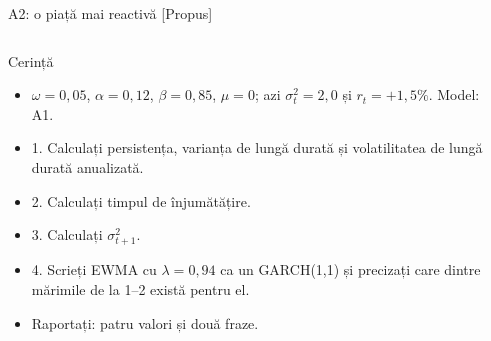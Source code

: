 \begin{frame}{A2: o piață mai reactivă [Propus]}
\propsub
\itemsize{\scriptsize}
\begin{columns}[T]
\begin{column}{\taskw}
\begin{block}{Cerință}
\begin{itemize}
    \item $\omega = 0{,}05$, $\alpha = 0{,}12$, $\beta = 0{,}85$, $\mu = 0$; azi $\sigma_t^2 = 2{,}0$ și $r_t = +1{,}5\%$. Model: A1.
    \item 1. Calculați persistența, varianța de lungă durată și volatilitatea de lungă durată anualizată.
    \item 2. Calculați timpul de înjumătățire.
    \item 3. Calculați $\sigma_{t+1}^2$.
    \item 4. Scrieți EWMA cu $\lambda = 0{,}94$ ca un GARCH(1,1) și precizați care dintre mărimile de la 1--2 există pentru el.
    \item Raportați: patru valori și două fraze.
\end{itemize}
\end{block}
\end{column}
\begin{column}{\solw}
\end{column}
\end{columns}
\end{frame}

